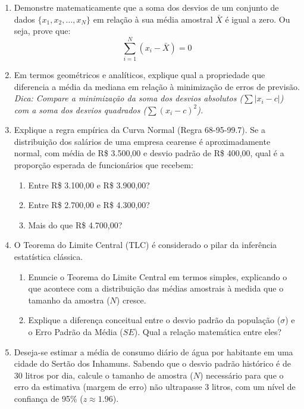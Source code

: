 \documentclass[12pt]{article}
\begin{document}
\begin{enumerate}[label=\textbf{Questão \arabic*}]
    \item Demonstre matematicamente que a soma dos desvios de um conjunto de dados $\{x_1, x_2, \dots, x_N\}$ em relação à sua média amostral $\bar{X}$ é igual a zero. Ou seja, prove que:
    $$\sum_{i=1}^{N} (x_i - \bar{X}) = 0$$

    \item Em termos geométricos e analíticos, explique qual a propriedade que diferencia a média da mediana em relação à minimização de erros de previsão. \\
    \textit{Dica: Compare a minimização da soma dos desvios absolutos ($\sum |x_i - c|$) com a soma dos desvios quadrados ($\sum (x_i - c)^2$).}

    \item Explique a regra empírica da Curva Normal (Regra 68-95-99.7). Se a distribuição dos salários de uma empresa cearense é aproximadamente normal, com média de R\$ 3.500,00 e desvio padrão de R\$ 400,00, qual é a proporção esperada de funcionários que recebem:
    \begin{enumerate}[label=\alph*)]
        \item Entre R\$ 3.100,00 e R\$ 3.900,00?
        \item Entre R\$ 2.700,00 e R\$ 4.300,00?
        \item Mais do que R\$ 4.700,00?
    \end{enumerate}

    \item O Teorema do Limite Central (TLC) é considerado o pilar da inferência estatística clássica. 
    \begin{enumerate}[label=\alph*)]
        \item Enuncie o Teorema do Limite Central em termos simples, explicando o que acontece com a distribuição das médias amostrais à medida que o tamanho da amostra ($N$) cresce.
        \item Explique a diferença conceitual entre o desvio padrão da população ($\sigma$) e o Erro Padrão da Média ($SE$). Qual a relação matemática entre eles?
    \end{enumerate}

    \item Deseja-se estimar a média de consumo diário de água por habitante em uma cidade do Sertão dos Inhamuns. Sabendo que o desvio padrão histórico é de 30 litros por dia, calcule o tamanho de amostra ($N$) necessário para que o erro da estimativa (margem de erro) não ultrapasse 3 litros, com um nível de confiança de 95\% ($z \approx 1.96$).
\end{enumerate}
\end{document}
